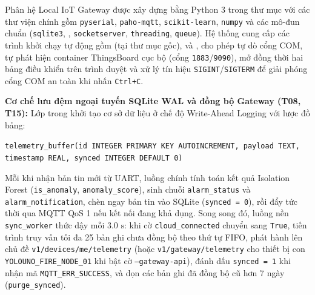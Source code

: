 Phân hệ Local IoT Gateway được xây dựng bằng Python 3 trong thư mục  với các thư viện chính gồm \texttt{pyserial}, \texttt{paho-mqtt}, \texttt{scikit-learn}, \texttt{numpy} và các mô-đun chuẩn (\texttt{sqlite3}, , \texttt{socketserver}, \texttt{threading}, \texttt{queue}). Hệ thống cung cấp các trình khởi chạy tự động gồm  (tại thư mục gốc),  và , cho phép tự dò cổng COM, tự phát hiện container ThingsBoard cục bộ (cổng \texttt{1883}/\texttt{9090}), mở đồng thời hai bảng điều khiển trên trình duyệt và xử lý tín hiệu \texttt{SIGINT}/\texttt{SIGTERM} để giải phóng cổng COM an toàn khi nhấn \texttt{Ctrl+C}.

\textbf{Cơ chế lưu đệm ngoại tuyến SQLite WAL và đồng bộ Gateway (T08, T15):}
Lớp  trong  khởi tạo cơ sở dữ liệu  ở chế độ Write-Ahead Logging với lược đồ bảng:
\begin{center}
  \texttt{telemetry\_buffer(id INTEGER PRIMARY KEY AUTOINCREMENT, payload TEXT, timestamp REAL, synced INTEGER DEFAULT 0)}
\end{center}
Mỗi khi nhận bản tin mới từ UART, luồng chính tính toán kết quả Isolation Forest (\texttt{is\_anomaly}, \texttt{anomaly\_score}), sinh chuỗi \texttt{alarm\_status} và \texttt{alarm\_notification}, chèn ngay bản tin vào SQLite (\texttt{synced = 0}), rồi đẩy tức thời qua MQTT QoS 1 nếu kết nối đang khả dụng. Song song đó, luồng nền \texttt{sync\_worker} thức dậy mỗi $3.0\text{ s}$: khi cờ \texttt{cloud\_connected} chuyển sang \texttt{True}, tiến trình truy vấn tối đa 25 bản ghi chưa đồng bộ theo thứ tự FIFO, phát hành lên chủ đề \texttt{v1/devices/me/telemetry} (hoặc \texttt{v1/gateway/telemetry} cho thiết bị con \texttt{YOLOUNO\_FIRE\_NODE\_01} khi bật cờ \texttt{--gateway-api}), đánh dấu \texttt{synced = 1} khi nhận mã \texttt{MQTT\_ERR\_SUCCESS}, và dọn các bản ghi đã đồng bộ cũ hơn 7 ngày (\texttt{purge\_synced}).

